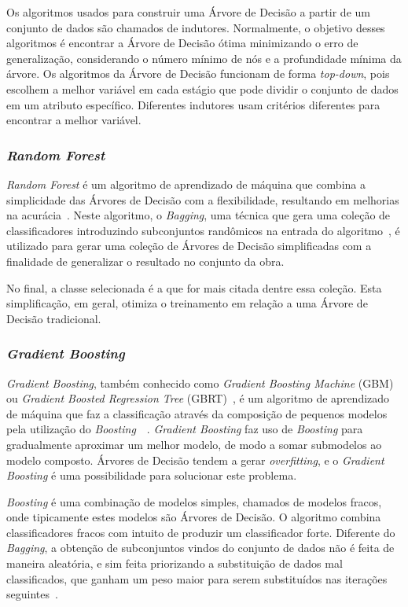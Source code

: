 \documentclass[Portugues,Final]{ic-tese-v3}
\begin{document}
Os algoritmos usados para construir uma Árvore de Decisão a partir de um conjunto de dados são chamados de indutores. Normalmente, o objetivo desses algoritmos é encontrar a Árvore de Decisão ótima minimizando o erro de generalização, considerando o número mínimo de nós e a profundidade mínima da árvore. Os algoritmos da Árvore de Decisão funcionam de forma \textit{top-down}, pois escolhem a melhor variável em cada estágio que pode dividir o conjunto de dados em um atributo específico. Diferentes indutores usam critérios diferentes para encontrar a melhor variável.

\subsubsection{\textit{Random Forest}}

\textit{Random Forest} é um algoritmo de aprendizado de máquina que combina a simplicidade das Árvores de Decisão com a flexibilidade, resultando em melhorias na acurácia~\cite{Breiman_2001}. Neste algoritmo, o \textit{Bagging}, uma técnica que gera uma coleção de classificadores introduzindo subconjuntos randômicos na entrada do algoritmo~\cite{Witten_2016}, é utilizado para gerar uma coleção de Árvores de Decisão simplificadas com a finalidade de generalizar o resultado no conjunto da obra.

No final, a classe selecionada é a que for mais citada dentre essa coleção. Esta simplificação, em geral, otimiza o treinamento em relação a uma Árvore de Decisão tradicional.

\subsubsection{\textit{Gradient Boosting}}

\textit{Gradient Boosting}, também conhecido como \textit{Gradient Boosting Machine} (GBM) ou \textit{Gradient Boosted Regression Tree} (GBRT)~\cite{Chen_2016}, é um algoritmo de aprendizado de máquina que faz a classificação através da composição de pequenos modelos pela utilização do \textit{Boosting}~\cite{Friedman_2000}~\cite{Hastie_2009}. \textit{Gradient Boosting} faz uso de \textit{Boosting} para gradualmente aproximar um melhor modelo, de modo a somar submodelos ao modelo composto. Árvores de Decisão tendem a gerar \textit{overfitting}, e o \textit{Gradient Boosting} é uma possibilidade para solucionar este problema.

\textit{Boosting} é uma combinação de modelos simples, chamados de modelos fracos, onde tipicamente estes modelos são Árvores de Decisão. O algoritmo combina classificadores fracos com intuito de produzir um classificador forte. Diferente do \textit{Bagging}, a obtenção de subconjuntos vindos do conjunto de dados não é feita de maneira aleatória, e sim feita priorizando a substituição de dados mal classificados, que ganham um peso maior para serem substituídos nas iterações seguintes~\cite{Hastie_2009}.
\end{document}
